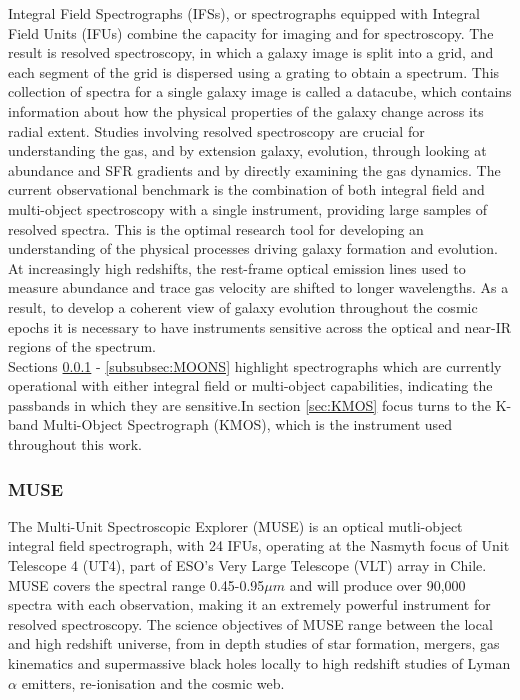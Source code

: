 \documentclass{literature}
\begin{document}
Integral Field Spectrographs (IFSs), or spectrographs equipped with Integral Field Units (IFUs) combine the capacity for imaging and for spectroscopy. The result is resolved spectroscopy, in which a galaxy image is split into a grid, and each segment of the grid is dispersed using a grating to obtain a spectrum. This collection of spectra for a single galaxy image is called a datacube, which contains information about how the physical properties of the galaxy change across its radial extent. Studies involving resolved spectroscopy are crucial for understanding the gas, and by extension galaxy, evolution, through looking at abundance and SFR gradients and by directly examining the gas dynamics. The current observational benchmark is the combination of both integral field and multi-object spectroscopy with a single instrument, providing large samples of resolved spectra. This is the optimal research tool for developing an understanding of the physical processes driving galaxy formation and evolution. At increasingly high redshifts, the rest-frame optical emission lines used to measure abundance and trace gas velocity are shifted to longer wavelengths. As a result, to develop a coherent view of galaxy evolution throughout the cosmic epochs it is necessary to have instruments sensitive across the optical and near-IR regions of the spectrum.  \\ 

Sections \ref{subsubsec:MUSE} - \ref{subsubsec:MOONS} highlight spectrographs which are currently operational with either integral field or multi-object capabilities, indicating the passbands in which they are sensitive.In section \ref{sec:KMOS} focus turns to the K-band Multi-Object Spectrograph (KMOS), which is the instrument used throughout this work.     

\subsubsection{MUSE}\label{subsubsec:MUSE}
The Multi-Unit Spectroscopic Explorer (MUSE) \citep{Bacon2010} is an optical mutli-object integral field spectrograph, with 24 IFUs, operating at the Nasmyth focus of Unit Telescope 4 (UT4), part of ESO's Very Large Telescope (VLT) array in Chile. MUSE covers the spectral range 0.45-0.95$\mu m$ and will produce over 90,000 spectra with each observation, making it an extremely powerful instrument for resolved spectroscopy. The science objectives of MUSE range between the local and high redshift universe, from in depth studies of star formation, mergers, gas kinematics and supermassive black holes locally to high redshift studies of Lyman$\alpha$ emitters, re-ionisation and the cosmic web.
\end{document}
